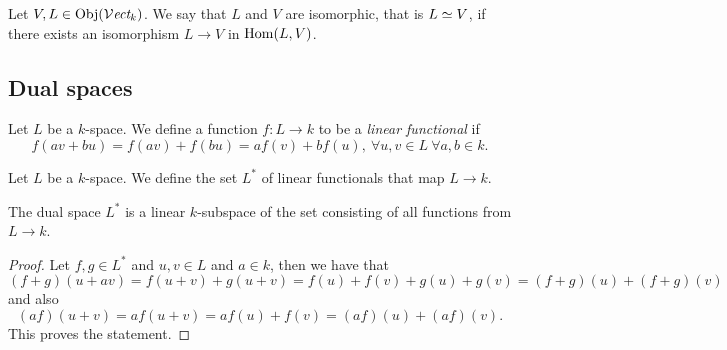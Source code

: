\begin{definition}[Isomorphism]
   Let \(V, L \in \operatorname{Obj}({\mathcal{V}\textit{ect}}_k)\). We say that \(L\) and \(V\) are
   isomorphic, that is \(L \simeq V\), if there exists an isomorphism \(L \to V\)
   in \(\operatorname{Hom}(L, V)\).
\end{definition}

\subsection{Dual spaces}

\begin{definition}\label{def: linear functional}
   Let \(L\) be a \(k\)-space. We define a function \(f : L \to k\) to be a
   \emph{linear functional} if
   \[
      f(av + bu) = f(av) + f(bu) = af(v) + bf(u),\ \forall u, v \in L\ \forall
      a, b \in k.
   \]
\end{definition}

\begin{definition}\label{def: dual space}
   Let \(L\) be a \(k\)-space. We define the set \(L^\ast\) of linear
   functionals that map \(L \to k\).
\end{definition}

\begin{proposition}
   The dual space \(L^\ast\) is a linear \(k\)-subspace of the set consisting of
   all functions from \(L \to k\).
\end{proposition}

\begin{proof}
   Let \(f, g \in L^\ast\) and \(u, v \in L\) and \(a \in k\), then we have that
   \[(f + g)(u + av) = f(u+v) + g(u+v) = f(u) + f(v) + g(u) + g(v) = (f + g)(u)
   + (f + g)(v)\] and also \[(af)(u + v) = af(u + v) = af(u) + f(v) = (af)(u) +
   (af)(v).\] This proves the statement.
\end{proof}
